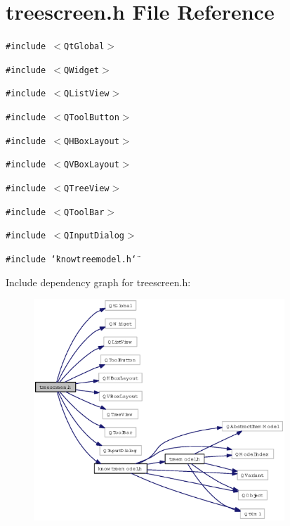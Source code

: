 \section{treescreen.h File Reference}
\label{treescreen_8h}
{\tt \#include $<$Qt\-Global$>$}\par
{\tt \#include $<$QWidget$>$}\par
{\tt \#include $<$QList\-View$>$}\par
{\tt \#include $<$QTool\-Button$>$}\par
{\tt \#include $<$QHBox\-Layout$>$}\par
{\tt \#include $<$QVBox\-Layout$>$}\par
{\tt \#include $<$QTree\-View$>$}\par
{\tt \#include $<$QTool\-Bar$>$}\par
{\tt \#include $<$QInput\-Dialog$>$}\par
{\tt \#include \char`\"{}knowtreemodel.h\char`\"{}}\par


Include dependency graph for treescreen.h:\begin{figure}[H]
\begin{center}
\leavevmode
\includegraphics[width=268pt]{treescreen_8h__incl}
\end{center}
\end{figure}


